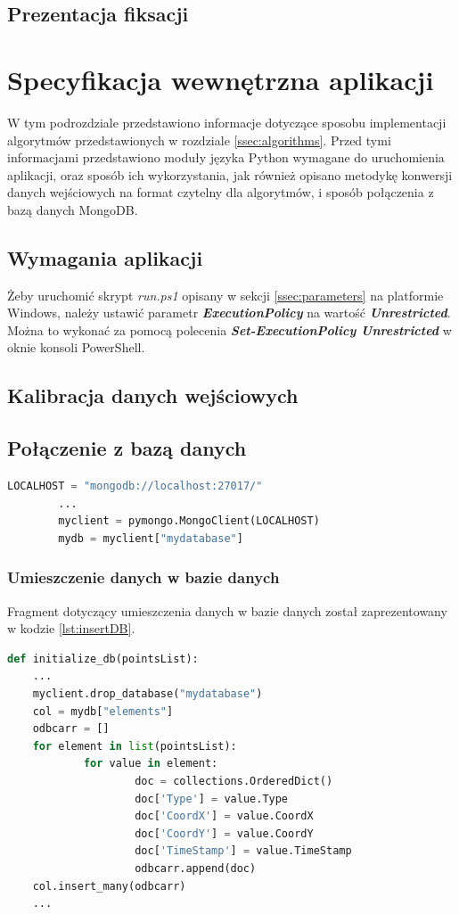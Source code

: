 \subsection{Prezentacja fiksacji}
\blindtext
\section{Specyfikacja wewnętrzna aplikacji}
\label{sec:internal}
W tym podrozdziale przedstawiono informacje dotyczące sposobu implementacji algorytmów przedstawionych w rozdziale \ref{ssec:algorithms}. Przed tymi informacjami przedstawiono moduły języka Python wymagane do uruchomienia aplikacji, oraz sposób ich wykorzystania, jak również opisano metodykę konwersji danych wejściowych na format czytelny dla algorytmów, i sposób połączenia z bazą danych MongoDB.
\subsection{Wymagania aplikacji}
\label{ssec:apprequirements}
Żeby uruchomić skrypt \emph{run.ps1} opisany w sekcji \ref{ssec:parameters} na platformie Windows, należy ustawić parametr \emph{\textbf{ExecutionPolicy}} na wartość \emph{\textbf{Unrestricted}}. Można to wykonać za pomocą polecenia \emph{\textbf{Set-ExecutionPolicy Unrestricted}} w oknie konsoli PowerShell.\par
\subsection{Kalibracja danych wejściowych}
\label{ssec:calibration}
\blindtext
\subsection{Połączenie z bazą danych}
\label{ssec:connectionDB}
\begin{lstlisting}[language=Python, caption=Połączenie z bazą danych, label={lst:connectDB}]
        LOCALHOST = "mongodb://localhost:27017/"
        ...
        myclient = pymongo.MongoClient(LOCALHOST)
        mydb = myclient["mydatabase"]
\end{lstlisting}

\subsubsection{Umieszczenie danych w bazie danych}
Fragment dotyczący umieszczenia danych w bazie danych został zaprezentowany w kodzie \ref{lst:insertDB}. 
\begin{lstlisting}[language=Python, caption=Umieszczenie danych w bazie danych, label={lst:insertDB}]
def initialize_db(pointsList):
    ...
    myclient.drop_database("mydatabase")
    col = mydb["elements"]
    odbcarr = []
    for element in list(pointsList):
            for value in element:
                    doc = collections.OrderedDict()
                    doc['Type'] = value.Type
                    doc['CoordX'] = value.CoordX
                    doc['CoordY'] = value.CoordY
                    doc['TimeStamp'] = value.TimeStamp
                    odbcarr.append(doc)
    col.insert_many(odbcarr)
    ...
\end{lstlisting}
